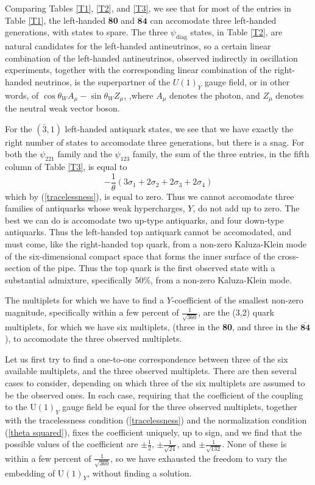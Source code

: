 \documentclass[a4paper,12pt,oneside]{article}
\begin{document}
Comparing Tables \ref{T1}, \ref{T2}, and \ref{T3}, we see that for 
most of the entries in Table \ref{T1}, the left-handed \textbf{80} 
and $\mathbf{\overline{84}}$ can accomodate three left-handed
generations, with states to spare.  The three $\psi_\mathrm{diag}$
states, in Table \ref{T2}, are natural candidates for the 
left-handed antineutrinos, so a certain linear combination of the
left-handed antineutrinos, observed indirectly in oscillation
experiments, together with the corresponding linear combination of
the right-handed neutrinos, is the superpartner of the $U(1)_Y$ 
gauge field, or in other words, of $\cos\theta_WA_\mu-\sin\theta_W
Z_\mu$, \cite{Rosner},where $A_\mu$ denotes the photon, and $Z_\mu$
denotes the neutral weak vector boson.

For the $(\bar{3},1)$ left-handed antiquark states, we see that we
have exactly the right number of states to accomodate three 
generations, but there is a snag.  For both the $\psi_{221}$ family
and the $\psi_{123}$ family, the sum of the three entries, in the
fifth column of Table \ref{T3}, is equal to
\begin{equation}\label{sum of three entries}
-\frac{1}{\theta}
\left(3\sigma_1+2\sigma_2+2\sigma_3+2\sigma_4\right)
\end{equation}
which by (\ref{tracelessness}), is equal to zero.  Thus we cannot
accomodate three families of antiquarks whose weak hypercharges, 
$Y$, do not add up to zero.  The best we can do is accomodate two
up-type antiquarks, and four down-type antiquarks.  Thus the 
left-handed top antiquark cannot be accomodated, and must come, 
like the right-handed top quark, from
a non-zero Kaluza-Klein mode of the six-dimensional compact space 
that forms the inner surface of the cross-section of the pipe.  Thus
the top quark is the first observed state with a substantial
admixture, specifically 50\%, from a non-zero Kaluza-Klein mode.

The multiplets for which we have to find a $Y$-coefficient of the
smallest non-zero magnitude, specifically within a few percent of
$\frac{1}{\sqrt{360}}$, are the (3,2) quark multiplets, for which we
have six multiplets, (three in the \textbf{80}, and three in the
$\mathbf{\overline{84}}$), to accomodate the three observed 
multiplets.

Let us first try to find a one-to-one correspondence between three of the six available multiplets, and the three observed
multiplets.  There are then several cases to consider, depending on
which three of the six multiplets are assumed to be the observed 
ones.  In each case, requiring that the coefficient of the coupling
to the $\mathrm{U}(1)_Y$ gauge field be equal for the three observed
multiplets, together with the tracelessness condition 
(\ref{tracelessness}) and the normalization condition
(\ref{theta squared}), fixes the coefficient
uniquely, up to sign, and we find that the possible values of the 
coefficient are $\pm\frac{1}{2}$, $\pm\frac{1}{\sqrt{24}}$, and 
$\pm\frac{1}{\sqrt{132}}$.  None of these is within a few percent 
of $\frac{1}{\sqrt{360}}$, so we have 
exhausted the freedom to vary the embedding of $\mathrm{U}(1)_Y$,
without finding a solution.
\end{document}
